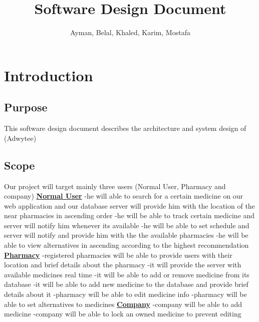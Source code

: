 \documentclass[]{article}
\title{Software Design Document}
\author{Ayman, Belal, Khaled, Karim, Mostafa}
\begin{document}
\maketitle

\section{Introduction}
\subsection{Purpose}
This software design document describes the architecture and system design of (Adwytee)


\subsection{Scope}
Our project will target mainly three users (Normal User, Pharmacy and company)
\newline
\newline
\textbf{\underline{Normal User}}
\newline
{}-he will able to search for a certain medicine on our web application and our database server will provide him with the location of the near pharmacies in 			ascending order
-he will be able to track certain medicine and server will notify him whenever its available
-he will be able to set schedule and server will notify and provide him with the the available pharmacies
-he will be able to view alternatives in ascending according to the highest recommendation
\newline
\newline
\textbf{\underline{Pharmacy}}
\newline
{}-registered pharmacies will be able to provide users with their location and brief details about the pharmacy
-it will provide the server with available medicines real time
-it will be able to add or remove medicine from its database
-it will be able to add new medicine to the database and provide	brief details about it
-pharmacy will be able to edit medicine info 
-pharmacy will be able to set alternatives to medicines
\newline
\newline
\textbf{\underline{Company}}
\newline
{}-company will be able to add medicine
-company will be able to lock an owned medicine to prevent editing
\end{document}
